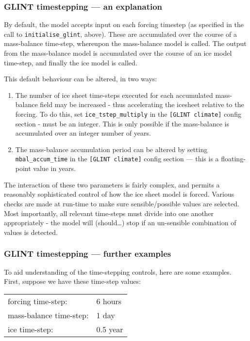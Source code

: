 \subsubsection{GLINT timestepping --- an explanation}

By default, the model accepts input on each forcing timestep (as specified in 
the call to \texttt{initialise\_glint}, above). These are accumulated over the course 
of a mass-balance time-step, whereupon the mass-balance model is called. The 
output from the mass-balance model is accumulated over the course of an ice 
model time-step, and finally the ice model is called.

This default behaviour can be altered, in two ways:
\begin{enumerate}
\item The number of ice sheet time-steps executed for each accumulated 
mass-balance field may be increased - thus accelerating the icesheet relative 
to the forcing. To do this, set \texttt{ice\_tstep\_multiply} in the \texttt{[GLINT climate]} 
config section - must be an integer. This is only possible if the 
mass-balance is accumulated over an integer number of years.
\item The mass-balance accumulation period can be altered by setting  
\texttt{mbal\_accum\_time} in the \texttt{[GLINT climate]} config section --- this is a 
floating-point value in years.
\end{enumerate}

The interaction of these two parameters is fairly complex, and permits a 
reasonably sophisticated control of how the ice sheet model is forced. 
Various checks are made at run-time to make sure sensible/possible values are selected. Most 
importantly, all relevant time-steps must divide into one another 
appropriately - the model will (should\ldots) stop if an un-sensible combination 
of values is detected.

\subsubsection{GLINT timestepping --- further examples}

To aid understanding of the time-stepping controls, here are some examples. First, suppose we have these time-step values:

\vspace{0.5cm}
\begin{tabular}{ll}
forcing time-step: & 6 hours \\
mass-balance time-step: & 1 day \\
ice time-step: & 0.5 year
\end{tabular}
\vspace{0.5cm}

